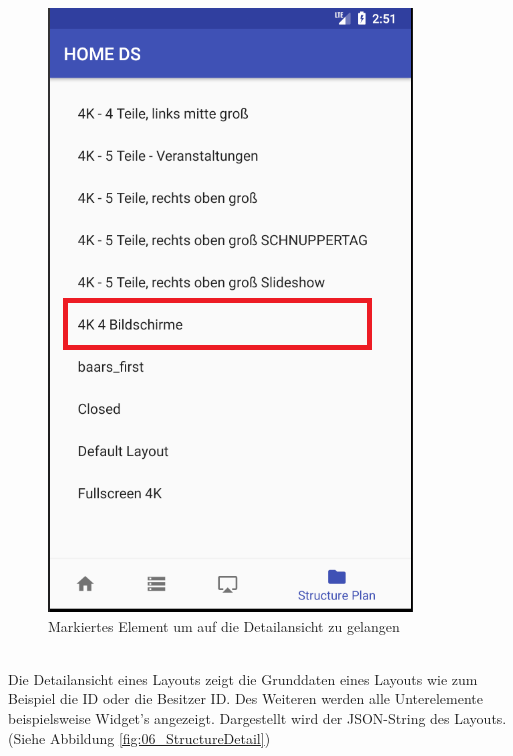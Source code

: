 \begin{figure}[H]
\centering
\includegraphics[scale=0.35]{images/06_AndroidApp/06_StructureNavigationToDetail}
\caption{Markiertes Element um auf die Detailansicht zu gelangen}
\label{fig:06_StructureNavigationToDetail}
\end{figure}
\\
Die Detailansicht eines Layouts zeigt die Grunddaten eines Layouts wie zum Beispiel die ID oder die Besitzer ID. Des Weiteren werden alle Unterelemente beispielsweise Widget's angezeigt. Dargestellt wird der JSON-String des Layouts.
(Siehe Abbildung \ref{fig:06_StructureDetail})
\\
